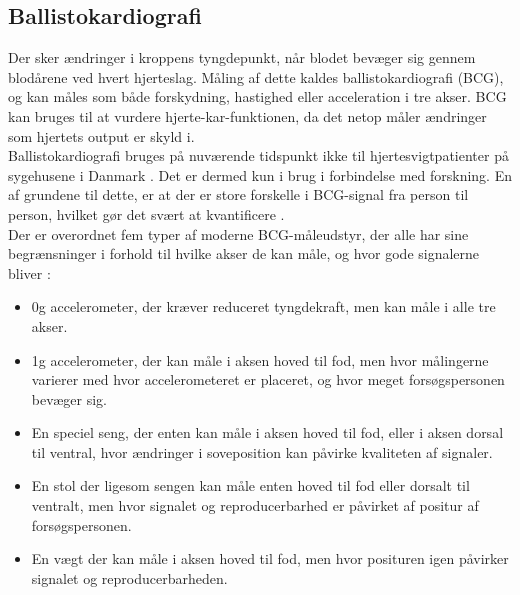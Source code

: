 \subsection{Ballistokardiografi}
Der sker ændringer i kroppens tyngdepunkt, når blodet bevæger sig gennem blodårene ved hvert hjerteslag. Måling af dette kaldes ballistokardiografi (BCG), og kan måles som både forskydning, hastighed eller acceleration i tre akser. BCG kan bruges til at vurdere hjerte-kar-funktionen, da det netop måler ændringer som hjertets output er skyld i. \citep{inan2015}\\
Ballistokardiografi bruges på nuværende tidspunkt ikke til hjertesvigtpatienter på sygehusene i Danmark \citep{DCS}. Det er dermed kun i brug i forbindelse med forskning. En af grundene til dette, er at der er store forskelle i BCG-signal fra person til person, hvilket gør det svært at kvantificere \citep{inan2009}.\\
Der er overordnet fem typer af moderne BCG-måleudstyr, der alle har sine begrænsninger i forhold til hvilke akser de kan måle, og hvor gode signalerne bliver \citep{inan2015}:
\begin{itemize}
    \item 0g accelerometer, der kræver reduceret tyngdekraft, men kan måle i alle tre akser.
    \item 1g accelerometer, der kan måle i aksen hoved til fod, men hvor målingerne varierer med hvor accelerometeret er placeret, og hvor meget forsøgspersonen bevæger sig.
    \item En speciel seng, der enten kan måle i aksen hoved til fod, eller i aksen dorsal til ventral, hvor ændringer i soveposition kan påvirke kvaliteten af signaler.
    \item En stol der ligesom sengen kan måle enten hoved til fod eller dorsalt til ventralt, men hvor signalet og reproducerbarhed er påvirket af positur af forsøgspersonen.
    \item En vægt der kan måle i aksen hoved til fod, men hvor posituren igen påvirker signalet og reproducerbarheden. 
\end{itemize}

